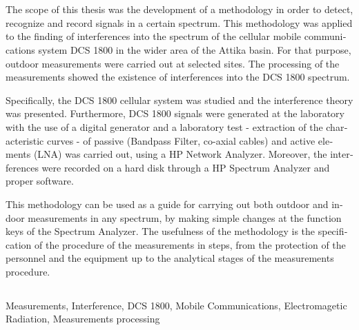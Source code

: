 \clearpage

\blankpagecount

\chapter*{}

\begin{otherlanguage}{english}
    The scope of this thesis was the development of a methodology in order
    to detect, recognize and record signals in a certain spectrum. This
    methodology was applied to the finding of interferences into the spectrum of
    the cellular mobile communications system DCS 1800 in the wider area of
    the Attika basin. For that purpose, outdoor measurements were carried out at
    selected sites. The processing of the measurements showed the existence of
    interferences into the DCS 1800 spectrum.

    Specifically, the DCS 1800 cellular system was studied and the
    interference theory was presented. Furthermore, DCS 1800 signals were
    generated at the laboratory with the use of a digital generator and a
    laboratory test - extraction of the characteristic curves - of passive
    (Bandpass Filter, co-axial cables) and active elements (LNA) was carried
    out, using a HP Network Analyzer. Moreover, the interferences were
    recorded on a hard disk through a HP Spectrum Analyzer and proper
    software.

    This methodology can be used as a guide for carrying out both outdoor and
    indoor measurements in any spectrum, by making simple changes at the
    function keys of the Spectrum Analyzer. The usefulness of the methodology
    is the specification of the procedure of the measurements in steps, from the
    protection of the personnel and the equipment up to the analytical stages of
    the measurements procedure.

    \vspace{20ex}
    \section*{}
    Measurements, Interference, DCS 1800, Mobile Communications,
    Electromagetic Radiation, Measurements processing
\end{otherlanguage}
\clearpage

